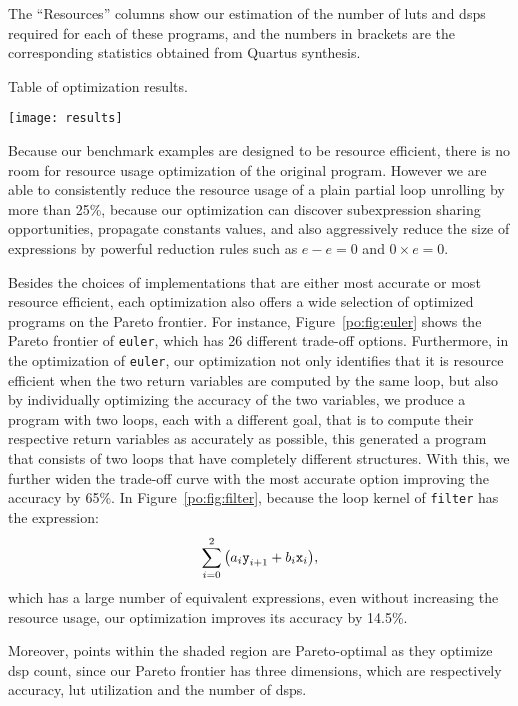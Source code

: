 The ``Resources'' columns show our estimation of the number of \glspl{lut}
and \glspl{dsp} required for each of these programs, and the numbers in
brackets are the corresponding statistics obtained from Quartus synthesis.

\begin{table}[ht]
    \centering
    \caption{
        Table of optimization results.
    }\label{po:fig:results}
    \texttt{[image: results]}
\end{table}

Because our benchmark examples are designed to be resource efficient, there
is no room for resource usage optimization of the original program.  However
we are able to consistently reduce the resource usage of a plain partial
loop unrolling by more than 25\%, because our optimization can discover
subexpression sharing opportunities, propagate constants values, and also
aggressively reduce the size of expressions by powerful reduction rules such as
$e - e = 0$ and $0 \times e = 0$.

Besides the choices of implementations that are either most accurate or most
resource efficient, each optimization also offers a wide selection of optimized
programs on the Pareto frontier.  For instance, Figure~\ref{po:fig:euler}
shows the Pareto frontier of \texttt{euler}, which has 26 different trade-off
options.  Furthermore, in the optimization of \texttt{euler}, our optimization
not only identifies that it is resource efficient when the two return variables
are computed by the same loop, but also by individually optimizing the
accuracy of the two variables, we produce a program with two loops, each with
a different goal, that is to compute their respective return variables as
accurately as possible, this generated a program that consists of two loops
that have completely different structures.  With this, we further widen the
trade-off curve with the most accurate option improving the accuracy by 65\%.
In Figure~\ref{po:fig:filter}, because the loop kernel of \texttt{filter}
has the expression:
\begin{equation}
    \sum_{i=0}^2{\left( a_i \texttt{y}_{i+1} + b_i \texttt{x}_i \right)},
\end{equation}
which has a large number of equivalent expressions, even without increasing the
resource usage, our optimization improves its accuracy by 14.5\%.

Moreover, points within the shaded region are Pareto-optimal as they optimize
\gls{dsp} count, since our Pareto frontier has three dimensions, which are
respectively accuracy, \gls{lut} utilization and the number of \glspl{dsp}.

